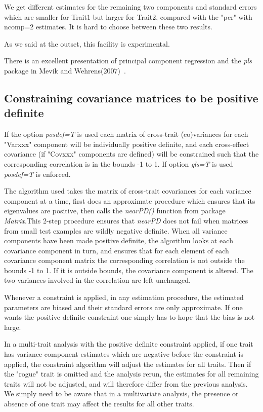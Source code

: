\documentclass[titlepage]{article}  %
\begin{document}
We get different estimates for the remaining two components and standard errors which are smaller for Trait1 but larger for Trait2, compared with the "pcr"  with ncomp=2 estimates.
It is hard to choose between these two results.

As we said at the outset, this facility is experimental.

There is an excellent presentation of principal component regression and the {\em pls} package in Mevik and Wehrens(2007)~\cite{mevi:07}.

\subsection{Constraining covariance matrices to be positive definite}
If the option {\em posdef=T} is used each matrix of cross-trait (co)variances for each "Varxxx" component will be individually positive definite, and each cross-effect covariance (if "Covxxx" components are defined) will be constrained such that the corresponding correlation is in the bounds -1 to 1. If option {\em gls=T} is used {\em posdef=T} is enforced.

 The algorithm used takes the matrix of cross-trait covariances for each variance component at a time, first does an approximate procedure which ensures that its eigenvalues are positive, then calls the {\em nearPD()} function from package {\em Matrix}.This 2-step procedure ensures that {\em nearPD} does not fail when matrices from small test examples are wildly negative definite. When all variance components have been made positive definite, the algorithm looks at each covariance component in turn, and ensures that for each element of each covariance component matrix the corresponding correlation is not outside the bounds -1 to 1. If it is outside bounds, the covariance component is altered. The two variances involved in the correlation are left unchanged.

 Whenever a constraint is applied, in any estimation procedure, the estimated parameters are biased and their standard errors are only approximate. If one wants the positive definite constraint one simply has to hope that the bias is not large. 

 In a multi-trait analysis with the positive definite constraint applied, if one trait has variance component estimates which are negative before the constraint is applied, the constraint algorithm will adjust the estimates for all traits. Then if the "rogue" trait is omitted and the analysis rerun, the estimates for all remaining traits will not be adjusted, and will therefore differ from the previous analysis. We simply need to be aware that in a multivariate analysis, the presence or absence of one trait may affect the results for all other traits.
\end{document}
